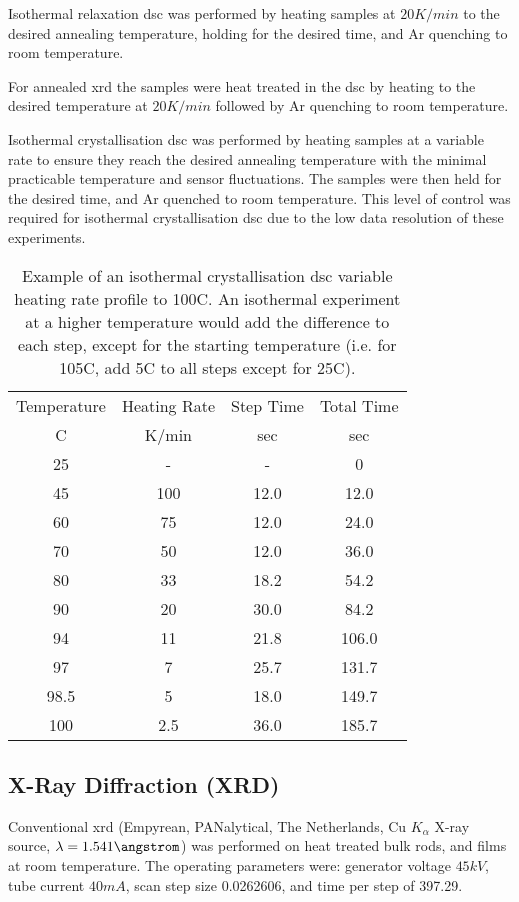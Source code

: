 Isothermal relaxation \acrshort{dsc} was performed by heating samples at $20 K/min$ to the desired annealing temperature, holding for the desired time, and Ar quenching to room temperature.

For annealed \acrshort{xrd} the samples were heat treated in the \acrshort{dsc} by heating to the desired temperature at $20 K/min$ followed by Ar quenching to room temperature.

Isothermal crystallisation \acrshort{dsc} was performed by heating samples at a variable rate to ensure they reach the desired annealing temperature with the minimal practicable temperature and sensor fluctuations. The samples were then held for the desired time, and Ar quenched to room temperature. This level of control was required for isothermal crystallisation \acrshort{dsc} due to the low data resolution of these experiments. 

\begin{table}[h]
	\centering
	\caption{Example of an isothermal crystallisation \acrshort{dsc} variable heating rate profile to 100\degree C. An isothermal experiment at a higher temperature would add the difference to each step, except for the starting temperature (i.e. for 105\degree C, add 5\degree C to all steps except for 25\degree C).}
	\begin{tabular}{cccc}
		\toprule
		Temperature & Heating Rate & Step Time & Total Time \\
		\degree C   & K/min & sec  & sec \\
		\midrule
		25   & -     & -    & 0          \\
		45   & 100   & 12.0 & 12.0       \\
		60   & 75    & 12.0 & 24.0       \\
		70   & 50    & 12.0 & 36.0       \\
		80   & 33    & 18.2 & 54.2       \\
		90   & 20    & 30.0 & 84.2       \\
		94   & 11    & 21.8 & 106.0      \\
		97   & 7     & 25.7 & 131.7      \\
		98.5 & 5     & 18.0 & 149.7      \\
		100  & 2.5   & 36.0 & 185.7      \\
		\bottomrule  
	\end{tabular}
	\label{tab:RampingDSC}
\end{table} 

\subsection{X-Ray Diffraction (XRD)}
Conventional \acrshort{xrd} (Empyrean, PANalytical, The Netherlands, Cu $K_{\alpha}$ X-ray source, $\lambda = 1.541 \angstrom$) was performed on heat treated bulk rods, and films at room temperature. 
The operating parameters were: generator voltage $45 kV$, tube current $40 mA$, scan step size 0.0262606, and time per step of 397.29. 

